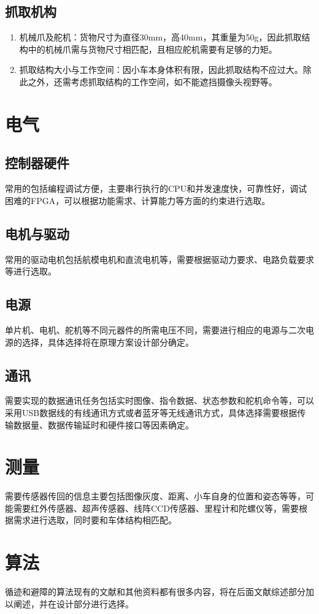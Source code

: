 \documentclass{report}
\begin{document}
\subsection{抓取机构}
\label{subsec:label}
\begin{enumerate}
\item 机械爪及舵机：货物尺寸为直径30mm，高40mm，其重量为50g，因此抓取结构中的机械爪需与货物尺寸相匹配，且相应舵机需要有足够的力矩。
  \item 抓取结构大小与工作空间：因小车本身体积有限，因此抓取结构不应过大。除此之外，还需考虑抓取结构的工作空间，如不能遮挡摄像头视野等。
  \end{enumerate}
  \newpage
\section{电气}
\label{subsec:label}
\subsection{控制器硬件}
\label{subsec:label}
常用的包括编程调试方便，主要串行执行的CPU和并发速度快，可靠性好，调试困难的FPGA，可以根据功能需求、计算能力等方面的约束进行选取。
\subsection{电机与驱动}
\label{subsec:label}
常用的驱动电机包括航模电机和直流电机等，需要根据驱动力要求、电路负载要求等进行选取。
\subsection{电源}
\label{subsec:label}
单片机、电机、舵机等不同元器件的所需电压不同，需要进行相应的电源与二次电源的选择，具体选择将在原理方案设计部分确定。
\subsection{通讯}
\label{subsec:label}
需要实现的数据通讯任务包括实时图像、指令数据、状态参数和舵机命令等，可以采用USB数据线的有线通讯方式或者蓝牙等无线通讯方式，具体选择需要根据传输数据量、数据传输延时和硬件接口等因素确定。
\section{测量}
\label{sec:label}
需要传感器传回的信息主要包括图像灰度、距离、小车自身的位置和姿态等等，可能需要红外传感器、超声传感器、线阵CCD传感器、里程计和陀螺仪等，需要根据需求进行选取，同时要和车体结构相匹配。
\section{算法}
\label{sec:label}
循迹和避障的算法现有的文献和其他资料都有很多内容，将在后面文献综述部分加以阐述，并在设计部分进行选择。
\end{document}
